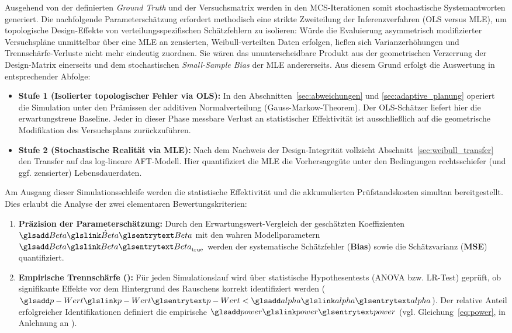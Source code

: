 Ausgehend von der definierten \textit{Ground Truth} und der Versuchsmatrix  werden in den \ac{MCS}-Iterationen somit stochastische Systemantworten generiert.
Die nachfolgende Parameterschätzung erfordert methodisch eine strikte Zweiteilung der Inferenzverfahren (\ac{OLS} versus \ac{MLE}), um topologische Design-Effekte von verteilungsspezifischen Schätzfehlern zu isolieren:
Würde die Evaluierung asymmetrisch modifizierter Versuchspläne unmittelbar über eine \ac{MLE} an zensierten, Weibull-verteilten Daten erfolgen, ließen sich Varianzerhöhungen und Trennschärfe-Verluste nicht mehr eindeutig zuordnen.
Sie wären das ununterscheidbare Produkt aus der geometrischen Verzerrung der Design-Matrix  einerseits und dem stochastischen \textit{Small-Sample Bias} der \ac{MLE} andererseits.
Aus diesem Grund erfolgt die Auswertung in entsprechender Abfolge:
\begin{itemize}
    \item \textbf{Stufe 1 (Isolierter topologischer Fehler via \ac{OLS}):} In den Abschnitten~\ref{sec:abweichungen} und \ref{sec:adaptive_planung} operiert die Simulation unter den Prämissen der additiven Normalverteilung (Gauss-Markow-Theorem). Der \ac{OLS}-Schätzer liefert hier die erwartungstreue Baseline. Jeder in dieser Phase messbare Verlust an statistischer Effektivität ist ausschließlich auf die geometrische Modifikation des Versuchsplans zurückzuführen.
    \item \textbf{Stufe 2 (Stochastische Realität via \ac{MLE}):} Nach dem Nachweis der Design-Integrität vollzieht Abschnitt~\ref{sec:weibull_transfer} den Transfer auf das log-lineare \ac{AFT}-Modell. Hier quantifiziert die \ac{MLE} die Vorhersagegüte unter den Bedingungen rechtsschiefer (und ggf. zensierter) Lebensdauerdaten.
\end{itemize}

Am Ausgang dieser Simulationsschleife werden die statistische Effektivität und die akkumulierten Prüfstandskosten simultan bereitgestellt. Dies erlaubt die Analyse der zwei elementaren Bewertungskriterien:
\begin{enumerate}
    \item \textbf{Präzision der Parameterschätzung:} Durch den Erwartungswert-Vergleich der geschätzten Koeffizienten $\hat{\sym{Beta}}$ mit den wahren Modellparametern $\sym{Beta}_{\text{true}}$ werden der systematische Schätzfehler (\textbf{Bias}) sowie die Schätzvarianz (\textbf{\ac{MSE}}) quantifiziert.
    \item \textbf{Empirische Trennschärfe ():} Für jeden Simulationslauf wird über statistische Hypothesentests (\ac{ANOVA} bzw. \ac{LR-Test}) geprüft, ob signifikante Effekte vor dem Hintergrund des Rauschens korrekt identifiziert werden ($\sym{p-Wert} < \sym{alpha}$). Der relative Anteil erfolgreicher Identifikationen definiert die empirische $\sym{power}$ (vgl. Gleichung~\eqref{eq:power}, in Anlehnung an \cite{Cohen.1988,Kremer.2021,Arndt.2022c}).
\end{enumerate}

